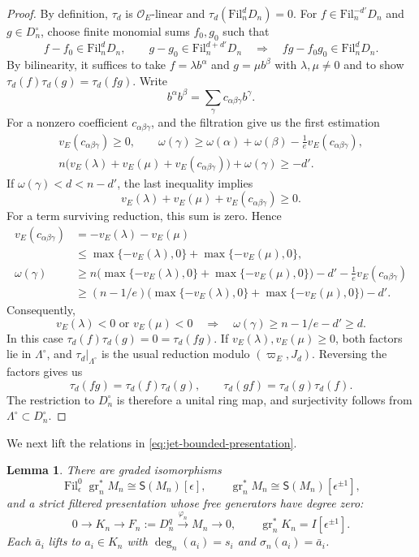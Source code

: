 \documentclass[11pt]{article}
\newtheorem{lemma}[theorem]{Lemma}
\theoremstyle{definition}
\newcommand{\cO}{\mathcal O}
\newcommand{\gr}{\operatorname{gr}}
\newcommand{\Fil}{\operatorname{Fil}}
\begin{document}
\begin{proof}
By definition, $\tau_d$ is $\cO_E$-linear and
$\tau_d(\mathrm{Fil}_n^dD_n)=0$. For
$f\in\mathrm{Fil}_n^{-d'}D_n$ and $g\in D_n^\circ$, choose finite
monomial sums $f_0,g_0$ such that
\[
 f-f_0\in\mathrm{Fil}_n^dD_n,\qquad
 g-g_0\in\mathrm{Fil}_n^{d+d'}D_n
 \quad\Rightarrow\quad
 fg-f_0g_0\in\mathrm{Fil}_n^dD_n.
\]
By bilinearity, it suffices to take $f=\lambda b^\alpha$ and
$g=\mu b^\beta$ with $\lambda,\mu\ne0$ and to show
$\tau_d(f)\tau_d(g)=\tau_d(fg)$. Write
\[
 b^\alpha b^\beta=\sum_\gamma c_{\alpha\beta\gamma}b^\gamma.
\]
For a nonzero coefficient $c_{\alpha\beta\gamma}$, \cite[Lemma~4.1]{ST03} and the filtration give us the first estimation
\[
 \begin{gathered}
 v_E(c_{\alpha\beta\gamma})\geq0,\qquad
 \omega(\gamma)\geq\omega(\alpha)+\omega(\beta)
                   -\frac1e v_E(c_{\alpha\beta\gamma}),\\
 n\bigl(v_E(\lambda)+v_E(\mu)+v_E(c_{\alpha\beta\gamma})\bigr)
       +\omega(\gamma)\geq-d'.
 \end{gathered}
\]
If $\omega(\gamma)<d<n-d'$, the last inequality implies
\[
 v_E(\lambda)+v_E(\mu)+v_E(c_{\alpha\beta\gamma})\geq0.
\]
For a term surviving reduction, this sum is zero. Hence
\[
 \begin{aligned}
 v_E(c_{\alpha\beta\gamma})
 &=-v_E(\lambda)-v_E(\mu)\\
 &\leq\max\{-v_E(\lambda),0\}+\max\{-v_E(\mu),0\},\\
 \omega(\gamma)
 &\geq n\bigl(\max\{-v_E(\lambda),0\}+\max\{-v_E(\mu),0\}\bigr)
       -d'-\frac1e v_E(c_{\alpha\beta\gamma})\\
 &\geq(n-1/e)\bigl(\max\{-v_E(\lambda),0\}
                         +\max\{-v_E(\mu),0\}\bigr)-d'.
 \end{aligned}
\]
Consequently,
\[
 v_E(\lambda)<0\text{ or }v_E(\mu)<0
 \quad\Rightarrow\quad
 \omega(\gamma)\geq n-1/e-d'\geq d.
\]
In this case $\tau_d(f)\tau_d(g)=0=\tau_d(fg)$.
If $v_E(\lambda),v_E(\mu)\geq0$, both factors lie in $\Lambda^\circ$, and $\tau_d|_{\Lambda^\circ}$
is the usual reduction modulo $(\varpi_E, J_d)$. Reversing the factors gives us
\[
 \tau_d(fg)=\tau_d(f)\tau_d(g),\qquad
 \tau_d(gf)=\tau_d(g)\tau_d(f).
\]
The restriction to $D_n^\circ$ is therefore a unital ring map, and
surjectivity follows from $\Lambda^\circ\subset D_n^\circ$.

\end{proof}

We next lift the relations in \eqref{eq:jet-bounded-presentation}.
\begin{lemma}\label{lem:analytic-jet-relations}
There are graded isomorphisms
\[
 \Fil_\epsilon^0\gr_n^*M_n\cong\mathsf S(M_n)[\epsilon],\qquad
 \gr_n^*M_n\cong\mathsf S(M_n)[\epsilon^{\pm1}],
\]
and a strict filtered presentation whose free generators have degree zero:
\[
 0\longrightarrow K_n\longrightarrow F_n:=D_n^{q}
   \xrightarrow{\varphi_n}M_n\longrightarrow0,\qquad
 \gr_n^*K_n=I[\epsilon^{\pm1}].
\]
Each $\bar a_i$ lifts to $a_i\in K_n$ with
$\deg_n(a_i)=s_i$ and $\sigma_n(a_i)=\bar a_i$.
\end{lemma}
\end{document}
